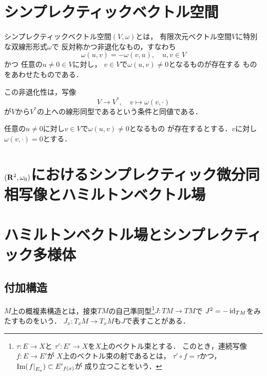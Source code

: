 \section{シンプレクティックベクトル空間}
\begin{DFN}
    シンプレクティックベクトル空間\(\left(V,\omega\right)\)とは，
    有限次元ベクトル空間\(V\)に特別な双線形形式\(\omega\)で
    反対称かつ非退化なもの，すなわち
    \begin{equation}
        \omega(u,v)=-\omega(v,u),\quad u,v\in V
    \end{equation}
    かつ
    任意の\(u\ne 0\in V\)に対し，
    \(v\in V\)で\(\omega(u,v)\ne0\)となるものが存在する
    ものをあわせたものである．
\end{DFN}
この非退化性は，写像
\begin{equation}
    V\to V^{\ast},\quad v\mapsto \omega(v,\cdot)
\end{equation}
が\(V\)から\(V^{\ast}\)の上への線形同型であるという条件と同値である．
\begin{CMT}
    任意の\(u\ne 0\)に対し\(v\in V\)で\(\omega(u,v)\ne0\)となるもの
    が存在するとする．\(v\)に対し
    \(\omega(v,\cdot)=0\)とする．
\end{CMT}

\section{\((\rr^2,\omega_{0})\)におけるシンプレクティック微分同相写像とハミルトンベクトル場}
\section{ハミルトンベクトル場とシンプレクティック多様体}
\subsection*{付加構造}
\(M\)上の概複素構造とは，接束\(TM\)の自己準同型\footnote{
    \(\tau\colon E\to X\)と
    \(\tau'\colon E'\to X\)を\(X\)上のベクトル束とする．
    このとき，連続写像\(f\colon E\to E'\)が
    \(X\)上のベクトル束の射であるとは，
    \(\tau'\circ f=\tau\)かつ，
    \(\im(\mres[f]{{E}_{x}})\subset {E'}_{f(x)}\)が
    成り立つことをいう．
}\(J\colon TM\to TM\)で
\(J^2=-\id_{TM}\)をみたすものをいう．
\(J_x\colon T_{x}M\to T_{x}M\)も\(J\)で表すことがある．

